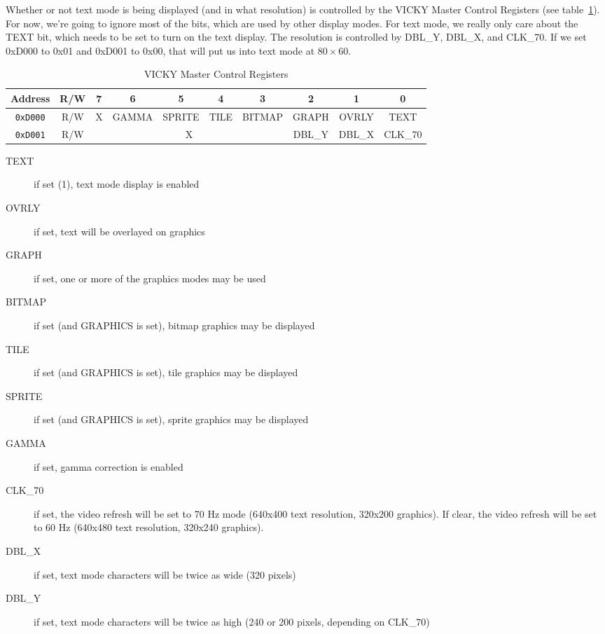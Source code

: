 Whether or not text mode is being displayed (and in what resolution) is controlled by the VICKY Master Control Registers (see table~\ref{tab:vky_master_ctrl_reg}). For now, we're going to ignore most of the bits, which are used by other display modes. For text mode, we really only care about the TEXT bit, which needs to be set to turn on the text display. The resolution is controlled by DBL\_Y, DBL\_X, and CLK\_70. If we set 0xD000 to 0x01 and 0xD001 to 0x00, that will put us into text mode at $80 \times 60$.

\begin{table}[h]
    \begin{center}
        \begin{tabular}{|c|c|c|c|c|c|c|c|c|c|} \hline
            Address & R/W & 7 & 6 & 5 & 4 & 3 & 2 & 1 & 0 \\ \hline\hline
            \verb+0xD000+ & R/W & X & GAMMA & SPRITE & TILE & BITMAP & GRAPH & OVRLY & TEXT \\ \hline
            \verb+0xD001+ & R/W & \multicolumn{5}{|c|}{X} & DBL\_Y & DBL\_X & CLK\_70 \\ \hline
        \end{tabular}
    \end{center}
    \caption{VICKY Master Control Registers}
    \label{tab:vky_master_ctrl_reg}
\end{table}

\begin{description}
    \item[TEXT] if set (1), text mode display is enabled

    \item[OVRLY] if set, text will be overlayed on graphics

    \item[GRAPH] if set, one or more of the graphics modes may be used

    \item[BITMAP] if set (and GRAPHICS is set), bitmap graphics may be displayed

    \item[TILE] if set (and GRAPHICS is set), tile graphics may be displayed

    \item[SPRITE] if set (and GRAPHICS is set), sprite graphics may be displayed

    \item[GAMMA] if set, gamma correction is enabled

    \item[CLK\_70] if set, the video refresh will be set to 70 Hz mode (640x400 text resolution, 320x200 graphics). If clear,
        the video refresh will be set to 60 Hz (640x480 text resolution, 320x240 graphics).

    \item[DBL\_X] if set, text mode characters will be twice as wide (320 pixels)

    \item[DBL\_Y] if set, text mode characters will be twice as high (240 or 200 pixels, depending on CLK\_70)
\end{description}

